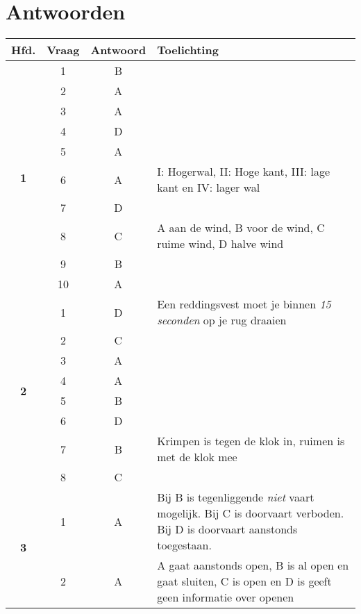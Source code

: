 \chapter{Antwoorden}
\vspace*{-120px}
\begin{table}[h!]
	\centering
	\begin{tabular}{c|c|c|m{9.5cm}}
		\textbf{Hfd.}       & \textbf{Vraag} & \textbf{Antwoord} & \textbf{Toelichting}                                             \\ \hline
		\multirow{10}{*}{\sffamily\bfseries{\textcolor{ocre}{\LARGE1}} } 
		& 1 & B & \\ \cline{2-4}          
		& 2 & A &  \\ \cline{2-4} 
		& 3 & A &  \\ \cline{2-4} 
		& 4 & D &  \\ \cline{2-4} 
		& 5 & A &  \\ \cline{2-4} 
		& 6 & A &  I: Hogerwal, II: Hoge kant, III: lage kant en IV: lager wal \\ \cline{2-4} 
		& 7 & D &  \\ \cline{2-4} 
		& 8 & C &  A aan de wind,  B voor de wind,  C ruime wind, D halve wind\\ \cline{2-4} 
		& 9 & B & \\ \cline{2-4} 
		& 10 & A &  \\ \cline{2-4} \hline
		\multirow{8}{*}{\sffamily\bfseries{\textcolor{ocre}{\LARGE2}} } 
		& 1 & D & Een reddingsvest moet je binnen \textit{15 seconden} op je rug draaien \\ \cline{2-4} 
		& 2 & C &  \\ \cline{2-4} 
		& 3 & A &  \\ \cline{2-4} 
		& 4 & A & \\ \cline{2-4} 
		& 5 & B & \\ \cline{2-4} 
		& 6 & D & \\ \cline{2-4} 
		& 7 & B & Krimpen is tegen de klok in, ruimen is met de klok mee\\ \cline{2-4} 
		& 8 & C & \\ \cline{2-4}  \hline
		\multirow{5}{*}{\sffamily\bfseries{\textcolor{ocre}{\LARGE3}} } 
		& 1 & A &  Bij B is tegenliggende \textit{niet} vaart mogelijk. Bij C is doorvaart verboden. Bij D is doorvaart aanstonds toegestaan.\\ \cline{2-4} 
		& 2 & A &  A gaat aanstonds open, B is al open en gaat sluiten, C is open en D is geeft geen informatie over openen\\ \cline{2-4} 

\end{tabular}
\end{table}
